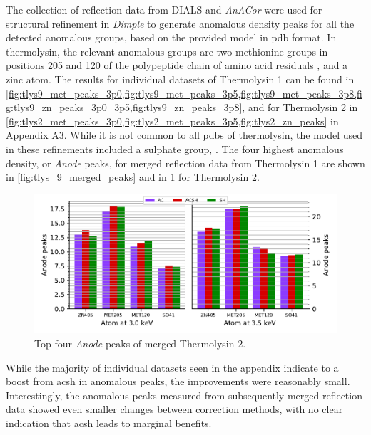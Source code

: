 The collection of reflection data from DIALS and \textit{AnACor} were used for structural refinement in \textit{Dimple} to generate anomalous density peaks for all the detected anomalous groups, based on the provided model in \ac{pdb} format. In thermolysin, the relevant anomalous groups are two methionine groups in positions 205 and 120 of the polypeptide chain of amino acid residuals \cite{CLAUDIO1984}, and a zinc atom. The results for individual datasets of Thermolysin 1 can be found in \cref{fig:tlys9_met_peaks_3p0,fig:tlys9_met_peaks_3p5,fig:tlys9_met_peaks_3p8,fig:tlys9_zn_peaks_3p0_3p5,fig:tlys9_zn_peaks_3p8}, and for Thermolysin 2 in \cref{fig:tlys2_met_peaks_3p0,fig:tlys2_met_peaks_3p5,fig:tlys2_zn_peaks} in Appendix A3. %
While it is not common to all \ac{pdb}s of thermolysin, the model used in these refinements included a sulphate group, . The four highest anomalous density, or \textit{Anode} peaks, for merged reflection data from Thermolysin 1 are shown in \cref{fig:tlys_9_merged_peaks} and in \cref{fig:tlys_2_merged_peaks} for Thermolysin 2.

\begin{figure}[h]
    \centering
    \includegraphics{plots/exp1/tlys_2_P6122/peaks/merged_peaks.pdf}
    \caption{Top four \textit{Anode} peaks of merged Thermolysin 2.}
    \label{fig:tlys_2_merged_peaks}
\end{figure}

While the majority of individual datasets seen in the appendix indicate to a boost from \ac{acsh} in anomalous peaks, the improvements were reasonably small. Interestingly, the anomalous peaks measured from subsequently merged reflection data showed even smaller changes between correction methods, with no clear indication that \ac{acsh} leads to marginal benefits.

